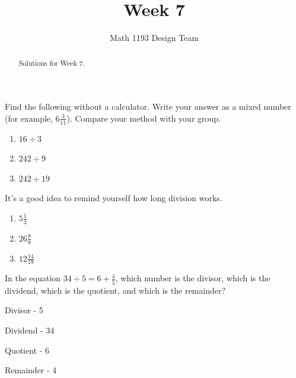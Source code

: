 \documentclass[noauthor]{ximera}
\title{Week 7}
\author{Math 1193 Design Team}
\begin{document}
\begin{abstract}
    Solutions for Week 7.
\end{abstract}
\maketitle

\begin{problem}
Find the following without a calculator. Write your answer as a 
mixed number (for example, \(6 \frac{3}{11}\)). Compare your method 
with your group.

\begin{enumerate}
    \item \(16 \div 3\)
    \item \(242 \div 9\)
    \item \(242 \div 19\)
\end{enumerate}

\begin{explanation}
It's a good idea to remind yourself how long division works.
\begin{enumerate}
    \item \(5 \frac{1}{3}\)
    \item \(26 \frac{8}{9}\)
    \item \(12 \frac{14}{19}\)
\end{enumerate}
\end{explanation}
\end{problem}

\begin{problem}
In the equation \(34 \div 5 = 6 + \frac{4}{5}\), which number
is the divisor, which is the dividend, which is the quotient, and 
which is the remainder?

\begin{explanation}
    Divisor - 5

    Dividend - 34 

    Quotient - 6

    Remainder - 4
\end{explanation}
\end{problem}
\end{document}
